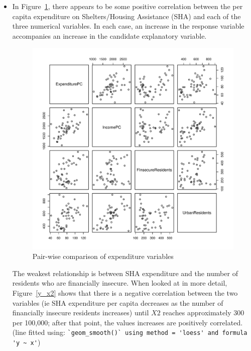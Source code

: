 \documentclass[12pt,letterpaper]{article}
\begin{document}
	\vspace{.5cm}
	\vspace{.5cm}
	\vspace{.5cm}
	\begin{itemize}
		
		\item
		In Figure~\ref{pairs}, there appears to be some positive correlation between
		the per capita expenditure on Shelters$/$Housing Assistance (SHA) and each of the three
		numerical variables.  In each case, an increase in the response variable accompanies an
		increase in the candidate explanatory variable.  
		
		\begin{figure}
		  \includegraphics{expenditure_pairs.pdf}
		  \caption{Pair-wise comparison of expenditure variables}\label{pairs}
		\end{figure}
		
		The weakest relationship is between SHA expenditure and the number of residents 
		who are financially insecure.  When looked at in more detail,  Figure~\ref{y_x2} shows that
		there is a negative correlation between the two variables (ie SHA expenditure per capita
		decreases as the number of financially insecure residents increases) until $X2$ reaches
		approximately 300 per 100,000;
		after that point, the values increases are positively correlated.  (line fitted using:
		\verb|`geom_smooth()` using method = 'loess' and formula 'y ~ x'|)



\end{itemize}
\end{document}
